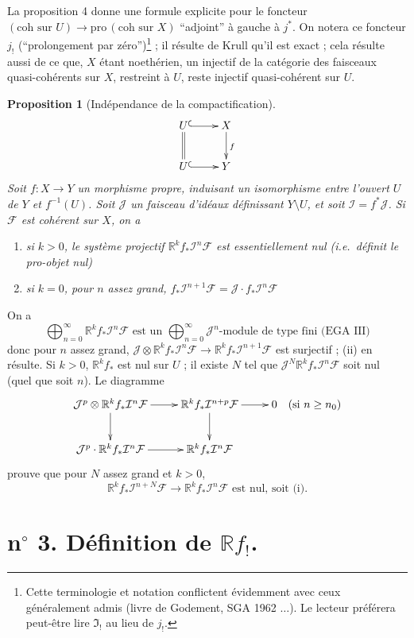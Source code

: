 \documentclass[12pt]{amsart}
\theoremstyle{plain}
\newtheorem{prop}{Proposition}
\theoremstyle{definition}
\newcommand{\Pro}{\text{pro}\,}
\newcommand{\cF}{\mathcal{F}}
\newcommand{\cI}{\mathcal{I}}
\newcommand{\cJ}{\mathcal{J}}
\newcommand{\bR}{\mathbb{R}}
\begin{document}
La proposition 4 donne une formule explicite pour le foncteur $(\text{coh sur } U) \to \Pro(\text{coh sur } X)$ ``adjoint'' \`a gauche \`a $j^{*}$. On notera ce foncteur $j_{!}$ (``prolongement par z\'ero'')\footnote{Cette terminologie et notation conflictent \'evidemment avec ceux g\'en\'eralement admis (livre de Godement, SGA 1962 $\ldots$). Le lecteur pr\'ef\'erera peut-\^etre lire $\mathfrak{I}_{!}$ au lieu de $j_{!}$.} ; il r\'esulte de Krull qu'il est exact ; cela r\'esulte aussi de ce que, $X$ \'etant noeth\'erien, un injectif de la cat\'egorie des faisceaux quasi-coh\'erents sur $X$, restreint \`a $U$, reste injectif quasi-coh\'erent sur $U$.

\begin{prop}[Ind\'ependance de la compactification]
\[
\xymatrix{
U \ar@{^{(}->}[r] \ar@{=}[d] & X \ar[d]^{f} \\
U \ar@{^{(}->}[r] & Y
}
\]
Soit $f: X \to Y$ un morphisme propre, induisant un isomorphisme entre l'ouvert $U$ de $Y$ et $f^{-1}(U)$. Soit $\cJ$ un faisceau d'id\'eaux d\'efinissant $Y \setminus U$, et soit $\cI = f^{*}\cJ$. Si $\cF$ est coh\'erent sur $X$, on a
\begin{enumerate}
\item[(i)] si $k > 0$, le syst\`eme projectif $\bR^{k}f_{*}\cI^{n}\cF$ est essentiellement nul (i.e.\ d\'efinit le pro-objet nul)
\item[(ii)] si $k = 0$, pour $n$ assez grand, $f_{*}\cI^{n+1}\cF = \cJ \cdot f_{*}\cI^{n}\cF$
\end{enumerate}
\end{prop}

On a
\[
\bigoplus_{n=0}^{\infty} \bR^{k}f_{*}\cI^{n}\cF \text{ est un } \bigoplus_{n=0}^{\infty} \cJ^{n}\text{-module de type fini (EGA III)}
\]
donc pour $n$ assez grand, $\cJ \otimes \bR^{k}f_{*}\cI^{n}\cF \to \bR^{k}f_{*}\cI^{n+1}\cF$ est surjectif ; (ii) en r\'esulte. Si $k > 0$, $\bR^{k}f_{*}$ est nul sur $U$ ; il existe $N$ tel que $\cJ^{N}\bR^{k}f_{*}\cI^{n}\cF$ soit nul (quel que soit $n$). Le diagramme
\[
\xymatrix{
\cJ^{p} \otimes \bR^{k}f_{*}\cI^{n}\cF \ar[r] \ar[d] & \bR^{k}f_{*}\cI^{n+p}\cF \ar[r] \ar[d] & 0 \quad (\text{si } n \geq n_{0}) \\
\cJ^{p} \cdot \bR^{k}f_{*}\cI^{n}\cF \ar[r] & \bR^{k}f_{*}\cI^{n}\cF
}
\]
prouve que pour $N$ assez grand et $k > 0$,
\[
\bR^{k}f_{*}\cI^{n+N}\cF \to \bR^{k}f_{*}\cI^{n}\cF \text{ est nul, soit (i).}
\]

\section*{n$^{\circ}$ 3. D\'efinition de $\bR f_{!}$.}
\end{document}
